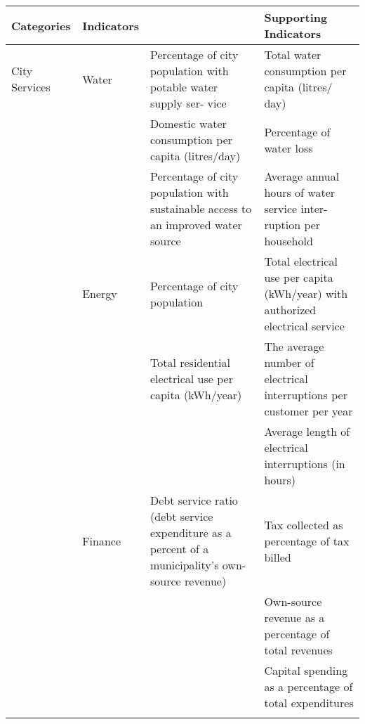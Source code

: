 \begin{landscape}
\begin{table}[th]
\begin{center}
\begin{tabular}{ >{\raggedright\arraybackslash}p{} >{\raggedright\arraybackslash}p{} >{\raggedright\arraybackslash}p{} >{\raggedright\arraybackslash}p{} } 
\hline
Categories & Indicators &  & Supporting Indicators \\
\hline
City Services & Water & Percentage of city population with potable water supply ser- vice & Total water consumption per capita (litres/ day) \\
  &  & Domestic water consumption per capita (litres/day) & Percentage of water loss \\
  &  & Percentage of city population with sustainable access to an improved water source \linebreak & Average annual hours of water service inter- ruption per household \\
  & Energy & Percentage of city population & Total electrical use per capita (kWh/year)
with authorized electrical service \\
  &  & Total residential electrical use per capita (kWh/year) & The average number of electrical interruptions per customer per year \\
  &  &  & Average length of electrical interruptions (in hours) \linebreak \\
  & Finance & Debt service ratio (debt service expenditure as a percent of a municipality’s own-source revenue) & Tax collected as percentage of tax billed \\
  &  &  & Own-source revenue as a percentage of total revenues \\
  &  &  & Capital spending as a percentage of total expenditures \\
\hline
\label{tbl:globalCityIndicatorsFacility3}
\end{tabular}
\end{center}
\end{table}


\end{landscape}
